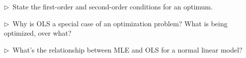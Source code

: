 \begin{reflect}
$\triangleright$~State the first-order and second-order conditions for an optimum.

\smallskip
$\triangleright$~Why is OLS a special case of an optimization problem? What is being optimized, over what?

\smallskip
$\triangleright$~What's the relationship between MLE and OLS for a normal linear model?
\end{reflect}
